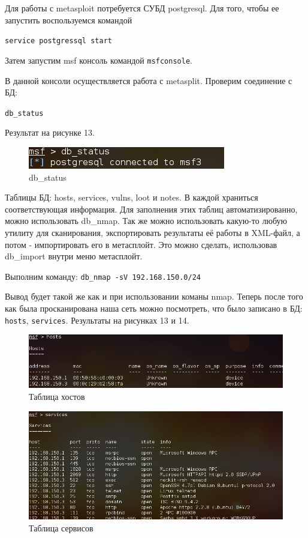 \documentclass[11pt, a4paper]{article}		%
\begin{document}
Для работы с metasploit потребуется СУБД postgresql. Для того, чтобы ее запустить воспользуемся командой 

\verb'service postgressql start'

Затем запустим msf консоль командой \verb'msfconsole'.

В данной консоли осуществляется работа с metasplit. Проверим соединение с БД:

\verb'db_status'

Результат на рисунке 13.

\begin{figure}[h!]
\centering
\includegraphics[scale=0.8]{res/db_status}
\caption{db\_status}
\end{figure}

Таблицы БД: hosts, services, vulns, loot и notes. В каждой храниться соответствующая информация.
Для заполнения этих таблиц автоматизированно, можно использовать db\_nmap. Так же можно использовать какую-то любую утилиту для сканирования, экспортировать результаты её работы в XML-файл, а потом - импортировать его в метасплойт. Это можно сделать, использовав db\_import внутри меню метасплойт.

Выполним команду: \verb'db_nmap -sV 192.168.150.0/24'

Вывод будет такой же как и при использовании команы nmap. Теперь после того как была просканирована наша сеть можно посмотреть, что было записано в БД: \verb'hosts', \verb'services'. Результаты на рисунках 13 и 14.

\begin{figure}[h!]
\centering
\includegraphics[scale=0.8]{res/msf_hosts}
\caption{Таблица хостов}
\end{figure}

\begin{figure}[h!]
\centering
\includegraphics[scale=0.8]{res/msf_services}
\caption{Таблица сервисов}
\end{figure}
\end{document}
